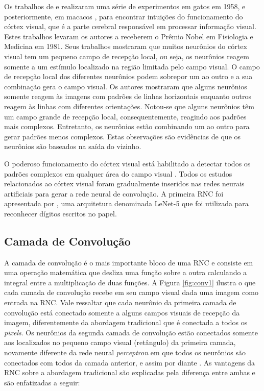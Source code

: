 Os trabalhos de \cite{hubel1959single} e \cite{hubel1959receptive} realizaram uma série de experimentos em gatos em 1958, e posteriormente, em macacos \citep{hubel1968receptive}, para encontrar intuições do funcionamento do córtex visual, que é a parte cerebral responsável em processar informação visual. Estes trabalhos levaram os autores a receberem o Prêmio Nobel em Fisiologia e Medicina em 1981. Seus trabalhos mostraram que muitos neurônios do córtex visual tem um pequeno campo de recepção local, ou seja, os neurônios reagem somente a um estímulo localizado na região limitada pelo campo visual. O campo de recepção local dos diferentes neurônios podem sobrepor um ao outro e a sua combinação gera o campo visual. Os autores mostraram que alguns neurônios somente reagem às imagens com padrões de linhas horizontais enquanto outros reagem às linhas com diferentes orientações. Notou-se que alguns neurônios têm um campo grande de recepção local, consequentemente, reagindo aos padrões mais complexos. Entretanto, os neurônios estão combinando um ao outro para gerar padrões menos complexos. Estas observações são evidências de que os neurônios são baseados na saída do vizinho. 

O poderoso funcionamento do córtex visual está habilitado a detectar todos os padrões complexos em qualquer área do campo visual \citep{geron2017hands}. Todos os estudos relacionados ao córtex visual foram gradualmente inseridos nas redes neurais artificiais para gerar a rede neural de convolução. A primeira RNC  foi apresentada por \cite{lecun1998gradient}, uma arquitetura denominada LeNet-5 que foi utilizada para reconhecer dígitos escritos no papel.

\subsection{Camada de Convolução}
A camada de convolução é o mais importante bloco de uma RNC e consiste em uma operação matemática que desliza uma função sobre a outra calculando a integral entre a multiplicação de duas funções. A Figura \ref{fig:conv1} ilustra o que cada camada de convolução recebe em seu campo visual dada uma imagem como entrada na RNC. Vale ressaltar que cada neurônio da primeira camada de convolução está conectado somente a alguns campos visuais de recepção da imagem, diferentemente da abordagem tradicional que é conectada a todos os \textit{pixels}. Os neurônios da segunda camada de convolução estão conectados somente aos localizados no pequeno campo visual (retângulo) da primeira camada, novamente diferente da rede neural \textit{perceptron} em que todos os neurônios são conectados com todos da camada anterior, e assim por diante \citep{geron2017hands}. As vantagens da RNC sobre a abordagem tradicional são explicadas pela diferença entre ambas e são enfatizadas a seguir:

